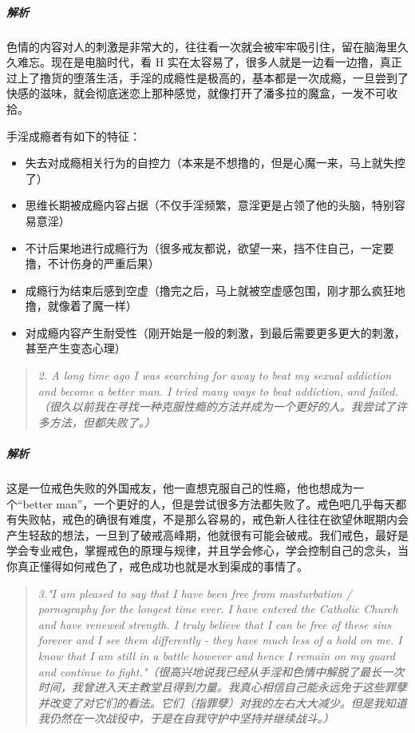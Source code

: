 \subparagraph{解析} 色情的内容对人的刺激是非常大的，往往看一次就会被牢牢吸引住，留在脑海里久久难忘。现在是电脑时代，看 H 实在太容易了，很多人就是一边看一边撸，真正过上了撸货的堕落生活，手淫的成瘾性是极高的，基本都是一次成瘾，一旦尝到了快感的滋味，就会彻底迷恋上那种感觉，就像打开了潘多拉的魔盒，一发不可收拾。

手淫成瘾者有如下的特征：

\begin{itemize}
    \item 失去对成瘾相关行为的自控力（本来是不想撸的，但是心魔一来，马上就失控了）
    \item 思维长期被成瘾内容占据（不仅手淫频繁，意淫更是占领了他的头脑，特别容易意淫）
    \item 不计后果地进行成瘾行为（很多戒友都说，欲望一来，挡不住自己，一定要撸，不计伤身的严重后果）
    \item 成瘾行为结束后感到空虚（撸完之后，马上就被空虚感包围，刚才那么疯狂地撸，就像着了魔一样）
    \item 对成瘾内容产生耐受性（刚开始是一般的刺激，到最后需要更多更大的刺激，甚至产生变态心理）
\end{itemize}

\begin{quote}\it
    2. A long time ago I was searching for away to beat my sexual addiction and become a better man. I tried many ways to beat addiction, and failed.（很久以前我在寻找一种克服性瘾的方法并成为一个更好的人。我尝试了许多方法，但都失败了。）
\end{quote}

\subparagraph{解析} 这是一位戒色失败的外国戒友，他一直想克服自己的性瘾，他也想成为一个“better man”，一个更好的人，但是尝试很多方法都失败了。戒色吧几乎每天都有失败帖，戒色的确很有难度，不是那么容易的，戒色新人往往在欲望休眠期内会产生轻敌的想法，一旦到了破戒高峰期，他就很有可能会破戒。我们戒色，最好是学会专业戒色，掌握戒色的原理与规律，并且学会修心，学会控制自己的念头，当你真正懂得如何戒色了，戒色成功也就是水到渠成的事情了。

\begin{quote}\it
    3."I am pleased to say that I have been free from masturbation / pornography for the longest time ever. I have entered the Catholic Church and have renewed strength. I truly believe that I can be free of these sins forever and I see them differently - they have much less of a hold on me. I know that I am still in a battle however and hence I remain on my guard and continue to fight."（很高兴地说我已经从手淫和色情中解脱了最长一次时间，我曾进入天主教堂且得到力量。我真心相信自己能永远免于这些罪孽并改变了对它们的看法。它们（指罪孽）对我的左右大大减少。但是我知道我仍然在一次战役中，于是在自我守护中坚持并继续战斗。）
\end{quote}

